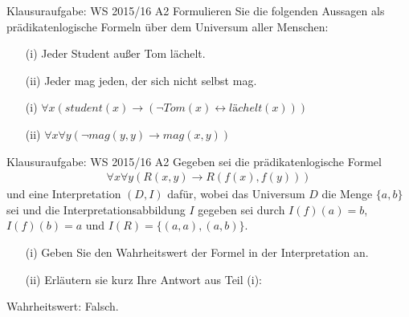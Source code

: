 \begin{frame}{Klausuraufgabe: WS 2015/16 A2}
  Formulieren Sie die folgenden Aussagen als prädikatenlogische Formeln über dem Universum aller Menschen:
  \begin{itemize}
    \item[(i)] Jeder Student außer Tom lächelt.
    \item[(ii)] Jeder mag jeden, der sich nicht selbst mag.
  \end{itemize}
  \pause
  \begin{itemize}
    \item[(i)] $\forall x(student(x)\rightarrow (\lnot Tom(x) \leftrightarrow lächelt(x)))$
    \pause
    \item[(ii)] $\forall x \forall y (\lnot mag(y,y)\rightarrow mag(x,y))$
  \end{itemize}
\end{frame}

\begin{frame}{Klausuraufgabe: WS 2015/16 A2}
  Gegeben sei die prädikatenlogische Formel
  \begin{align*}
    \forall x\forall y (R(x,y)\rightarrow R(f(x),f(y)))
  \end{align*}
  und eine Interpretation $(D,I)$ dafür, wobei das Universum $D$ die Menge $\{a,b\}$ sei und die Interpretationsabbildung $I$ gegeben sei durch $I(f)(a)=b$, $I(f)(b)=a$ und $I(R)=\{(a,a),(a,b)\}$.
  \begin{itemize}
    \item[(i)] Geben Sie den Wahrheitswert der Formel in der Interpretation an.
    \item[(ii)] Erläutern sie kurz Ihre Antwort aus Teil (i):
  \end{itemize}
  \pause
  Wahrheitswert: Falsch.
\end{frame}
